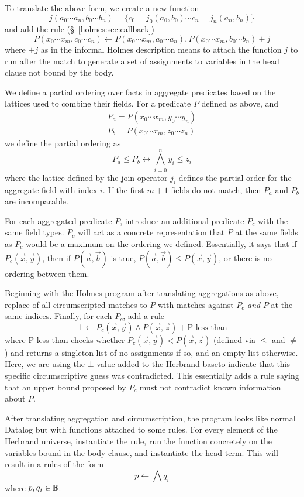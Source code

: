 To translate the above form, we create a new function
\[
	j(a_0 \cdots a_n, b_0 \cdots b_n) = \{c_0 = j_0(a_0, b_0) \cdots c_n = j_n(a_n, b_n)\}
\]
and add the rule (\S~\ref{holmes:sec:callback})
\[
	P(x_0 \cdots x_m, c_0 \cdots c_n) \leftarrow P(x_0 \cdots x_m, a_0 \cdots a_n), P(x_0 \cdots x_m, b_0 \cdots b_n) + j
\]
where $+ j$ as in the informal Holmes description means to attach the function $j$ to run after the match to generate a set of assignments to variables in the head clause not bound by the body.

We define a partial ordering over facts in aggregate predicates based on the lattices used to combine their fields.
For a predicate $P$ defined as above, and
\begin{align}
	P_a = P(x_0 \cdots x_m, y_0 \cdots y_n)\\
	P_b = P(x_0 \cdots x_m, z_0 \cdots z_n)
\end{align}
we define the partial ordering as
\[
	P_a \leq P_b \leftrightarrow \bigwedge_{i = 0}^n y_i \leq z_i
\]
where the lattice defined by the join operator $j_i$ defines the partial order for the  aggregate field with index $i$.
If the first $m + 1$ fields do not match, then $P_a$ and $P_b$ are incomparable.

For each aggregated predicate $P$, introduce an additional predicate $P_c$ with the same field types.
$P_c$ will act as a concrete representation that $P$ at the same fields as $P_c$ would be a maximum on the ordering we defined.
Essentially, it says that if $P_c(\vec{x}, \vec{y})$, then if $P(\vec{a}, \vec{b})$ is true, $P(\vec{a}, \vec{b}) \leq P(\vec{x}, \vec{y})$, or there is no ordering between them.

Beginning with the Holmes program after translating aggregations as above, replace of all circumscripted matches to $P$ with matches against $P_c$ \emph{and} $P$ at the same indices.
Finally, for each $P_c$, add a rule
\[
	\bot \leftarrow P_c(\vec{x}, \vec{y}) \wedge P(\vec{x}, \vec{z}) + \textrm{P-less-than}
\]
where P-less-than checks whether $P_c(\vec{x}, \vec{y}) < P(\vec{x}, \vec{z})$ (defined via $\leq$ and $\neq$) and returns a singleton list of no assignments if so, and an empty list otherwise.
Here, we are using the $\bot$ value added to the Herbrand baseto indicate that this specific circumscriptive guess was contradicted.
This essentially adds a rule saying that an upper bound proposed by $P_c$ must not contradict known information about $P$.

After translating aggregation and circumscription, the program looks like normal Datalog but with functions attached to some rules.
For every element of the Herbrand universe, instantiate the rule, run the function concretely on the variables bound in the body clause, and instantiate the head term.
This will result in a rules of the form
\[
	p \leftarrow \bigwedge q_i
\]
where $p, q_i \in \mathbb{B}$.

